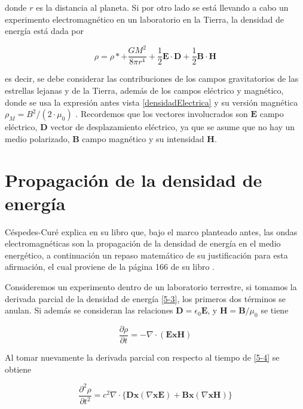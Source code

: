 donde $r$ es la distancia al planeta. Si por otro lado se está llevando a cabo un experimento electromagnético en un laboratorio en la Tierra, la densidad de energía está dada por

\begin{equation} \label{5-3}
    \rho = \rho* + \frac{GM^2}{8 \pi r^4} + \frac{1}{2}\textbf{E} \cdot \textbf{D} + \frac{1}{2}\textbf{B} \cdot \textbf{H}   
\end{equation}

es decir, se debe considerar las contribuciones de los campos gravitatorios de las estrellas lejanas y de la Tierra, además de los campos eléctrico y magnético, donde se usa la expresión antes vista \eqref{densidadElectrica} y su versión magnética $\rho_M = B^2/(2 \cdot \mu_0)$ . Recordemos que los vectores involucrados son $\textbf{E}$ campo eléctrico, $\textbf{D}$ vector de desplazamiento eléctrico, ya que se asume que no hay un medio polarizado,  $\textbf{B}$ campo magnético y su intensidad $\textbf{H}$.

\section{Propagación de la densidad de energía}

Céspedes-Curé explica en su libro que, bajo el marco planteado antes, las ondas electromagnéticas son la propagación de la densidad de energía en el medio energético, a continuación un repaso matemático de su justificación para esta afirmación, el cual proviene de la página 166 de su libro \cite{bib:el-libro}.

Consideremos un experimento dentro de un laboratorio terrestre, si tomamos la derivada parcial de la densidad de energía \eqref{5-3}, los primeros dos términos se anulan. Si además se consideran las relaciones $\textbf{D}=\epsilon_0 \textbf{E}$, y $\textbf{H}=\textbf{B}/\mu_0$ se tiene

\begin{equation} \label{5-4}
    \frac{\partial \rho}{\partial t}= - \nabla \cdot (\textbf{ExH})
\end{equation}

Al tomar nuevamente la derivada parcial con respecto al tiempo de \eqref{5-4} se obtiene

\begin{equation} \label{5-5}
     \frac{\partial^2 \rho}{\partial t^2}= c^2 \nabla \cdot \{\textbf{Dx}(\nabla \textbf{xE})+\textbf{Bx}(\nabla \textbf{xH})\} 
\end{equation}


